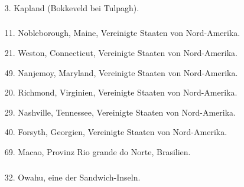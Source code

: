 \documentclass[a4paper, 11pt, oneside, polutonikogreek, german]{article}
\begin{document}
\subsubsection{}
\begin{itemize}
    
    \item[3.] Kapland (Bokkeveld bei Tulpagh).
\end{itemize}
\subsubsection{}
\begin{itemize}
    
    \item[11.] Nobleborough, Maine, Vereinigte Staaten von Nord-Amerika.
    \item[21.] Weston, Connecticut, Vereinigte Staaten von Nord-Amerika.
    \item[49.] Nanjemoy, Maryland, Vereinigte Staaten von Nord-Amerika.
    \item[20.] Richmond, Virginien, Vereinigte Staaten von Nord-Amerika.
    \item[29.] Nashville, Tennessee, Vereinigte Staaten von Nord-Amerika.
    \item[40.] Forsyth, Georgien, Vereinigte Staaten von Nord-Amerika.
    \item[69.] Macao, Provinz Rio grande do Norte, Brasilien.
\end{itemize}
\subsubsection{}
\begin{itemize}
    
    \item[32.] Owahu, eine der Sandwich-Inseln.
\end{itemize}
\subsection{}
\end{document}

